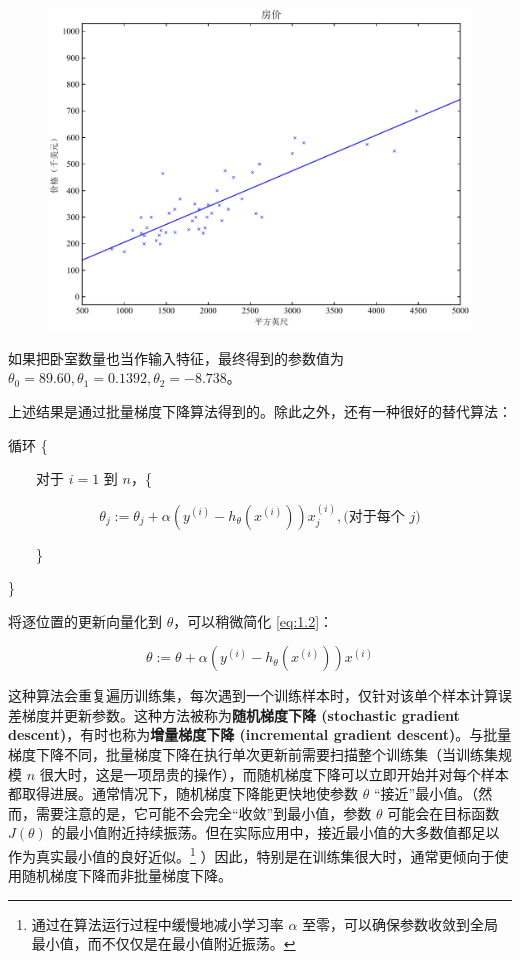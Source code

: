 \begin{figure}[H]
    \centering
    \includegraphics[width=0.5\linewidth]{figs/house_dataset_plot2.pdf}
\end{figure}
如果把卧室数量也当作输入特征，最终得到的参数值为 $\theta_0 = 89.60, \theta_1 = 0.1392, \theta_2 = -8.738$。

上述结果是通过批量梯度下降算法得到的。除此之外，还有一种很好的替代算法：

\vspace{0.5em}
循环 \{

$\quad\quad$对于 $i = 1$ 到 $n$，\{

\begin{equation}
    \theta_j := \theta_j + \alpha (y^{(i)} - h_\theta(x^{(i)})) x_j^{(i)}, \text{(对于每个 } j) \label{eq:1.2}
\end{equation}

$\quad\quad$\}

\indent\}
\vspace{0.5em}

将逐位置的更新向量化到 $\theta$，可以稍微简化 \eqref{eq:1.2}：

\[
    \theta := \theta + \alpha (y^{(i)} - h_\theta(x^{(i)})) x^{(i)}
\]

这种算法会重复遍历训练集，每次遇到一个训练样本时，仅针对该单个样本计算误差梯度并更新参数。这种方法被称为\textbf{随机梯度下降 (stochastic gradient descent)}，有时也称为\textbf{增量梯度下降 (incremental gradient descent)}。与批量梯度下降不同，批量梯度下降在执行单次更新前需要扫描整个训练集（当训练集规模 $n$ 很大时，这是一项昂贵的操作），而随机梯度下降可以立即开始并对每个样本都取得进展。通常情况下，随机梯度下降能更快地使参数 $\theta$ “接近”最小值。（然而，需要注意的是，它可能不会完全“收敛”到最小值，参数 $\theta$ 可能会在目标函数 $J(\theta)$ 的最小值附近持续振荡。但在实际应用中，接近最小值的大多数值都足以作为真实最小值的良好近似。\footnote{通过在算法运行过程中缓慢地减小学习率 $\alpha$ 至零，可以确保参数收敛到全局最小值，而不仅仅是在最小值附近振荡。} ）因此，特别是在训练集很大时，通常更倾向于使用随机梯度下降而非批量梯度下降。


